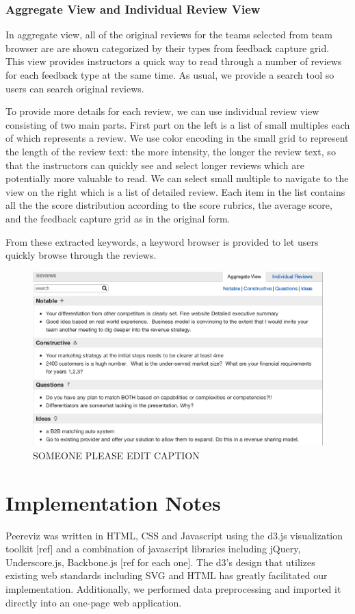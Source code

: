 \documentclass{sigchi}
\begin{document}
\subsubsection{Aggregate View and Individual Review View}

In aggregate view, all of the original reviews for the teams selected from team
browser are are shown categorized by their types from feedback capture grid.
This view provides instructors a quick way to read through a number of reviews
for each feedback type at the same time. As usual, we provide a search tool so
users can search original reviews.

To provide more details for each review, we can use individual review view
consisting of two main parts. First part on the left is a list of small
multiples each of which represents a review. We use color encoding in the small
grid to represent the length of the review text: the more intensity, the longer
the review text, so that the instructors can quickly see and select longer
reviews which are potentially more valuable to read. We can select small
multiple to navigate to the view on the right which is a list of detailed
review. Each item in the list contains all the the score distribution according
to the score rubrics, the average score, and the feedback capture grid as in the
original form.

From these extracted keywords, a keyword browser is provided to let users
quickly browse through the reviews.


\begin{figure}[]
\centering
\includegraphics[width=\columnwidth]{images/aggregate_view}
\caption{SOMEONE PLEASE EDIT CAPTION}
\label{fig:keyword-lists}
\end{figure}


\section{Implementation Notes}
Peereviz was written in HTML, CSS and Javascript using the d3.js visualization
toolkit [ref] and a combination of javascript libraries including jQuery,
Underscore.js, Backbone.js [ref for each one].  The d3’s design that utilizes
existing web standards including SVG and HTML has greatly facilitated our
implementation.  Additionally, we performed data preprocessing and imported it
directly into an one-page web application.
\end{document}
